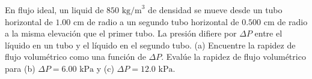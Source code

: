 \item En flujo ideal, un liquid de $850 \text{ kg/m}^3$ de densidad se mueve desde un tubo horizontal de $1.00 \text{ cm}$ de radio a un segundo tubo horizontal de $0.500 \text{ cm}$ de radio a la misma elevación que el primer tubo. La presión difiere por $\Delta P$ entre el líquido en un tubo y el líquido en el segundo tubo. (a) Encuentre la rapidez de flujo volumétrico como una función de $\Delta P$. Evalúe la rapidez de flujo volumétrico para (b) $\Delta P = 6.00 \text{ kPa}$ y (c) $\Delta P = 12.0 \text{ kPa}$.
